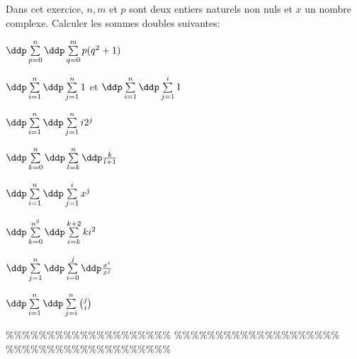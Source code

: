 



\begin{exercice}  \; 
Dans cet exercice, $n, m$ et $p$ sont deux entiers naturels non nuls et $x$ un nombre complexe. Calculer les sommes doubles suivantes:
\begin{enumerate}
\begin{minipage}[t]{0.3\textwidth}
\item $\ddp \sum\limits_{p=0}^{n} \ddp \sum\limits_{q=0}^{m} p(q^2+1)$
\item $\ddp \sum\limits_{i=1}^n\ddp \sum\limits_{j=1}^n 1$ \; et \; $\ddp \sum\limits_{i=1}^n\ddp \sum\limits_{j=1}^i 1$
\item $\ddp \sum\limits_{i=1}^n\ddp \sum\limits_{j=1}^n i2^j$
\end{minipage}
\begin{minipage}[t]{0.3\textwidth}
\item $\ddp \sum\limits_{k=0}^n\ddp \sum\limits_{l=k}^n \ddp\frac{k}{l+1}$
\item  $\ddp \sum\limits_{i=1}^n\ddp \sum\limits_{j=1}^i x^j$
\item  $\ddp \sum\limits_{k=0}^{n^2}\ddp \sum\limits_{i=k}^{k+2} ki^2$
\end{minipage}
\begin{minipage}[t]{0.3\textwidth}
\item  $\ddp \sum\limits_{j=1}^n\ddp \sum\limits_{i=0}^j \ddp\frac{ x^{i} }{  x^j }$
\item  $\ddp \sum\limits_{i=1}^n\ddp \sum\limits_{j=i}^n \binom{j}{i}$
\end{minipage}
 \end{enumerate}
\end{exercice}


\%\%\%\%\%\%\%\%\%\%\%\%\%\%\%\%\%\%\%\%
\%\%\%\%\%\%\%\%\%\%\%\%\%\%\%\%\%\%\%\%
\%\%\%\%\%\%\%\%\%\%\%\%\%\%\%\%\%\%\%\%




